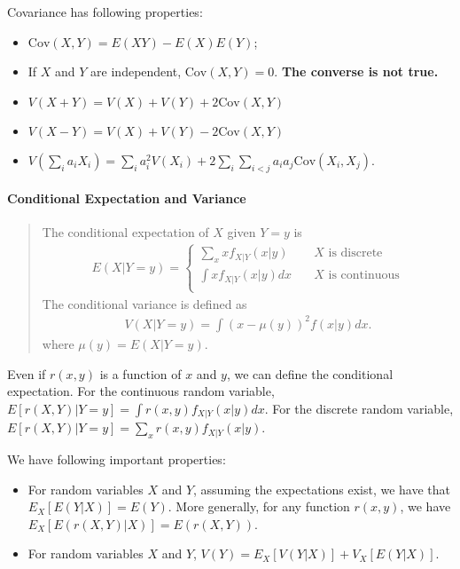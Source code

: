 \documentclass[
  12pt,
]{article}
\providecommand{\tightlist}{%
  \setlength{\itemsep}{0pt}\setlength{\parskip}{0pt}}
\begin{document}
Covariance has following properties:

\begin{itemize}
\tightlist
\item
  \(\mathrm{Cov}(X, Y) = E(XY) - E(X)E(Y)\);
\item
  If \(X\) and \(Y\) are independent, \(\mathrm{Cov}(X, Y) = 0\). \textbf{The converse is not true.}
\item
  \(V(X + Y) = V(X) + V(Y) + 2\mathrm{Cov}(X, Y)\)
\item
  \(V(X - Y) = V(X) + V(Y) - 2\mathrm{Cov}(X, Y)\)
\item
  \(V(\sum_i a_i X_i) = \sum_i a_i^2 V(X_i) + 2 \sum_i \sum_{i < j} a_i a_j \mathrm{Cov}(X_i, X_j)\).
\end{itemize}

\hypertarget{conditional-expectation-and-variance}{%
\paragraph{Conditional Expectation and Variance}\label{conditional-expectation-and-variance}}

\begin{quote}
The conditional expectation of \(X\) given \(Y = y\) is
\begin{align*}
E(X|Y = y)
=
\begin{cases}
\sum_x x f_{X|Y}(x|y) &\quad\text{$X$ is discrete}  \\
\int x f_{X|Y}(x|y) dx &\quad\text{$X$ is continuous}  \\
\end{cases}
\end{align*}
The conditional variance is defined as
\begin{align*}
V(X | Y = y) = \int (x - \mu(y))^2 f(x|y) dx.
\end{align*}
where \(\mu(y) = E(X | Y = y)\).
\end{quote}

Even if \(r(x, y)\) is a function of \(x\) and \(y\), we can define the conditional expectation.
For the continuous random variable, \(E[r(X, Y) | Y = y] = \int r(x, y) f_{X|Y}(x|y) dx\).
For the discrete random variable, \(E[r(X, Y) | Y = y] = \sum_x r(x, y) f_{X|Y}(x|y)\).

We have following important properties:

\begin{itemize}
\tightlist
\item
  For random variables \(X\) and \(Y\), assuming the expectations exist, we have that \(E_X[ E(Y|X) ] = E(Y)\). More generally, for any function \(r(x, y)\), we have \(E_X[ E(r(X, Y)|X) ] = E(r(X, Y))\).
\item
  For random variables \(X\) and \(Y\), \(V(Y) = E_X[ V(Y|X) ] + V_X[ E(Y|X) ]\).
\end{itemize}
\end{document}
